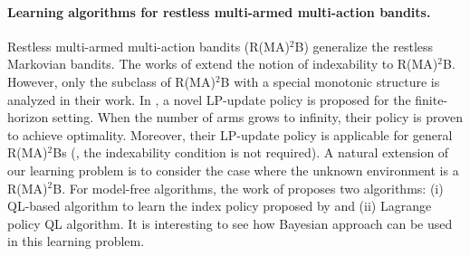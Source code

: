 \paragraph{Learning algorithms for restless multi-armed multi-action bandits.}
Restless multi-armed multi-action bandits (R(MA)$^2$B) generalize the restless Markovian bandits.
The works of \cite{glazebrook2011general,hodge2015asymptotic} extend the notion of indexability to R(MA)$^2$B.
However, only the subclass of R(MA)$^2$B with a special monotonic structure is analyzed in their work.
In \cite{gast2022lp}, a novel LP-update policy is proposed for the finite-horizon setting.
When the number of arms grows to infinity, their policy is proven to achieve optimality.
Moreover, their LP-update policy is applicable for general R(MA)$^2$Bs (\ie, the indexability condition is not required).
A natural extension of our learning problem is to consider the case where the unknown environment is a R(MA)$^2$B.
For model-free algorithms, the work of \cite{killian2021q} proposes two algorithms: (i) QL-based algorithm to learn the index policy proposed by \cite{glazebrook2011general} and (ii) Lagrange policy QL algorithm.
It is interesting to see how Bayesian approach can be used in this learning problem.




\endgroup
